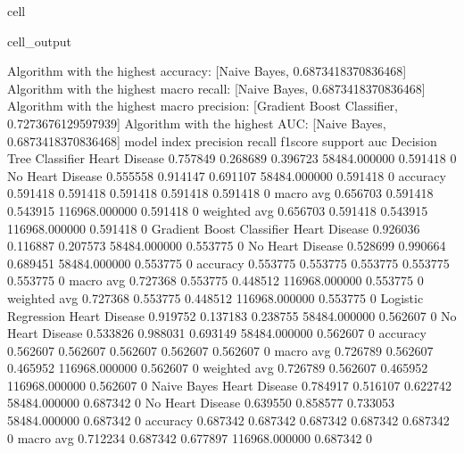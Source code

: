 \documentclass[letterpaper,10pt,english]{jupyterBook}
\begin{document}
\begin{sphinxuseclass}{cell}
\begin{sphinxVerbatimOutput}
\begin{sphinxuseclass}{cell_output}
\begin{sphinxVerbatim}[commandchars=\\\{\}]
Algorithm with the highest accuracy: [\PYGZsq{}Naive Bayes\PYGZsq{}, 0.6873418370836468]
Algorithm with the highest macro recall:
        [\PYGZsq{}Naive Bayes\PYGZsq{}, 0.6873418370836468]
Algorithm with the highest macro precision:
        [\PYGZsq{}Gradient Boost Classifier\PYGZsq{}, 0.7273676129597939]
Algorithm with the highest AUC:
        [\PYGZsq{}Naive Bayes\PYGZsq{}, 0.6873418370836468]
model                      index             precision  recall    f1\PYGZhy{}score  support        auc     
Decision Tree Classifier   Heart Disease     0.757849   0.268689  0.396723  58484.000000   0.591418    0
                           No Heart Disease  0.555558   0.914147  0.691107  58484.000000   0.591418    0
                           accuracy          0.591418   0.591418  0.591418  0.591418       0.591418    0
                           macro avg         0.656703   0.591418  0.543915  116968.000000  0.591418    0
                           weighted avg      0.656703   0.591418  0.543915  116968.000000  0.591418    0
Gradient Boost Classifier  Heart Disease     0.926036   0.116887  0.207573  58484.000000   0.553775    0
                           No Heart Disease  0.528699   0.990664  0.689451  58484.000000   0.553775    0
                           accuracy          0.553775   0.553775  0.553775  0.553775       0.553775    0
                           macro avg         0.727368   0.553775  0.448512  116968.000000  0.553775    0
                           weighted avg      0.727368   0.553775  0.448512  116968.000000  0.553775    0
Logistic Regression        Heart Disease     0.919752   0.137183  0.238755  58484.000000   0.562607    0
                           No Heart Disease  0.533826   0.988031  0.693149  58484.000000   0.562607    0
                           accuracy          0.562607   0.562607  0.562607  0.562607       0.562607    0
                           macro avg         0.726789   0.562607  0.465952  116968.000000  0.562607    0
                           weighted avg      0.726789   0.562607  0.465952  116968.000000  0.562607    0
Naive Bayes                Heart Disease     0.784917   0.516107  0.622742  58484.000000   0.687342    0
                           No Heart Disease  0.639550   0.858577  0.733053  58484.000000   0.687342    0
                           accuracy          0.687342   0.687342  0.687342  0.687342       0.687342    0
                           macro avg         0.712234   0.687342  0.677897  116968.000000  0.687342    0

\end{sphinxVerbatim}
\end{sphinxuseclass}
\end{sphinxVerbatimOutput}
\end{sphinxuseclass}
\end{document}
